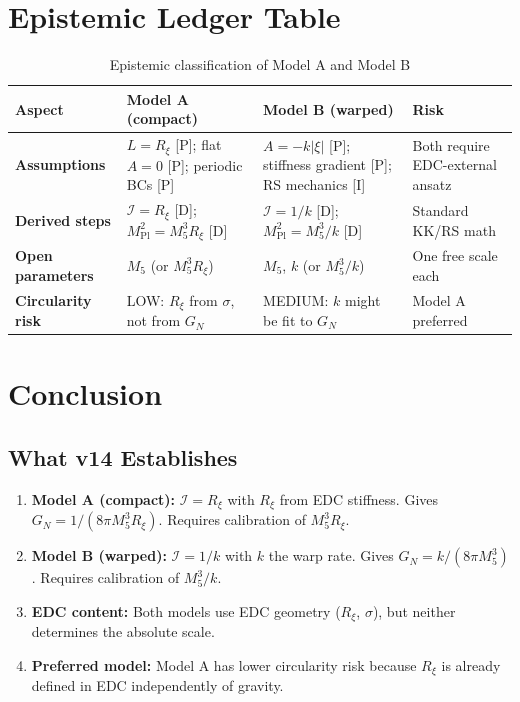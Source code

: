 \documentclass[11pt,a4paper]{article}
\newcommand{\Mpl}{M_{\text{Pl}}}
\newcommand{\Mfive}{M_5}
\newcommand{\GN}{G_N}
\newcommand{\calI}{\mathcal{I}}
\newcommand{\Rxi}{R_\xi}
\begin{document}
\section{Epistemic Ledger Table}
\label{sec:epistemic}

\begin{table}[ht]
\centering
\caption{Epistemic classification of Model A and Model B}
\label{tab:epistemic}
\small
\begin{tabular}{@{}p{2.5cm}p{4cm}p{4cm}p{2.5cm}@{}}
\toprule
\textbf{Aspect} & \textbf{Model A (compact)} & \textbf{Model B (warped)} & \textbf{Risk} \\
\midrule
\textbf{Assumptions} &
$L = \Rxi$ [P]; flat $A = 0$ [P]; periodic BCs [P] &
$A = -k|\xi|$ [P]; stiffness gradient [P]; RS mechanics [I] &
Both require EDC-external ansatz \\
\midrule
\textbf{Derived steps} &
$\calI = \Rxi$ [D]; $\Mpl^2 = \Mfive^3 \Rxi$ [D] &
$\calI = 1/k$ [D]; $\Mpl^2 = \Mfive^3/k$ [D] &
Standard KK/RS math \\
\midrule
\textbf{Open parameters} &
$\Mfive$ (or $\Mfive^3 \Rxi$) &
$\Mfive$, $k$ (or $\Mfive^3/k$) &
One free scale each \\
\midrule
\textbf{Circularity risk} &
LOW: $\Rxi$ from $\sigma$, not from $\GN$ &
MEDIUM: $k$ might be fit to $\GN$ &
Model A preferred \\
\bottomrule
\end{tabular}
\end{table}

\section{Conclusion}
\label{sec:conclusion}

\subsection{What v14 Establishes}

\begin{enumerate}
    \item \textbf{Model A (compact):} $\calI = \Rxi$ with $\Rxi$ from EDC stiffness.
          Gives $\GN = 1/(8\pi \Mfive^3 \Rxi)$. Requires calibration of $\Mfive^3 \Rxi$.

    \item \textbf{Model B (warped):} $\calI = 1/k$ with $k$ the warp rate.
          Gives $\GN = k/(8\pi \Mfive^3)$. Requires calibration of $\Mfive^3/k$.

    \item \textbf{EDC content:} Both models use EDC geometry ($\Rxi$, $\sigma$),
          but neither determines the absolute scale.

    \item \textbf{Preferred model:} Model A has lower circularity risk because
          $\Rxi$ is already defined in EDC independently of gravity.
\end{enumerate}
\end{document}
